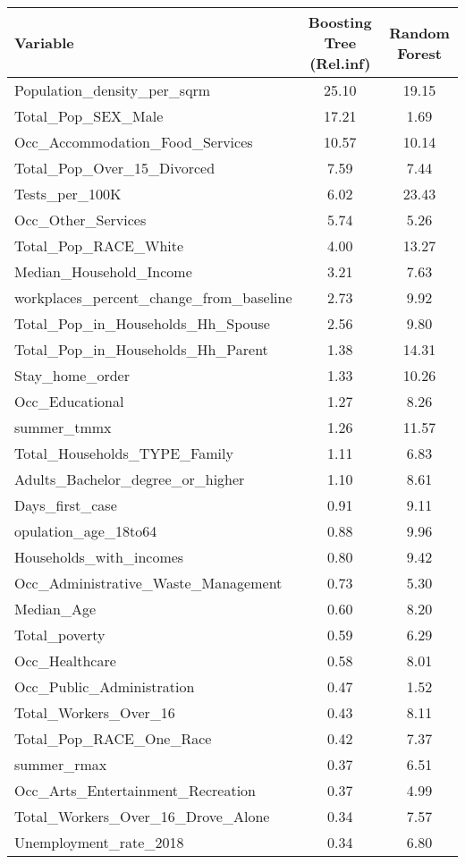 \documentclass[
]{article}
\begin{document}
\begin{table}[ht]
\centering
\begin{tabular}{lcc}
  \hline
Variable & Boosting Tree (Rel.inf) & Random Forest \\ 
  \hline
Population\_density\_per\_sqrm & 25.10 & 19.15 \\ 
Total\_Pop\_SEX\_Male & 17.21 & 1.69 \\ 
Occ\_Accommodation\_Food\_Services & 10.57 & 10.14 \\ 
Total\_Pop\_Over\_15\_Divorced & 7.59 & 7.44 \\ 
Tests\_per\_100K & 6.02 & 23.43 \\ 
Occ\_Other\_Services & 5.74 & 5.26 \\ 
Total\_Pop\_RACE\_White & 4.00 & 13.27 \\ 
Median\_Household\_Income & 3.21 & 7.63 \\ 
 workplaces\_percent\_change\_from\_baseline & 2.73 & 9.92 \\ 
 Total\_Pop\_in\_Households\_Hh_Spouse & 2.56 & 9.80  \\ 
 Total\_Pop\_in\_Households\_Hh\_Parent & 1.38 &  14.31 \\ 
  Stay\_home\_order & 1.33 & 10.26  \\ 
  Occ\_Educational & 1.27 & 8.26\\ 
  summer\_tmmx & 1.26 & 11.57 \\ 
  Total\_Households\_TYPE\_Family & 1.11 & 6.83\\ 
  Adults\_Bachelor\_degree\_or\_higher & 1.10 & 8.61\\ 
  Days\_first\_case & 0.91 & 9.11 \\ 
  opulation\_age\_18to64 & 0.88 & 9.96 \\ 
  Households\_with\_incomes & 0.80 & 9.42 \\ 
  Occ\_Administrative\_Waste\_Management & 0.73 & 5.30 \\ 
  Median\_Age & 0.60 & 8.20 \\ 
  Total\_poverty & 0.59 & 6.29 \\ 
  Occ\_Healthcare & 0.58 & 8.01 \\ 
  Occ\_Public\_Administration & 0.47 & 1.52 \\ 
  Total\_Workers\_Over\_16 & 0.43 & 8.11 \\ 
  Total\_Pop\_RACE\_One\_Race & 0.42 & 7.37 \\ 
  summer\_rmax & 0.37 & 6.51 \\ 
  Occ\_Arts\_Entertainment\_Recreation & 0.37 & 4.99 \\ 
  Total\_Workers\_Over\_16\_Drove\_Alone & 0.34 & 7.57 \\ 
  Unemployment\_rate\_2018 & 0.34 & 6.80 \\ 
   \hline
\end{tabular}
\end{table}

\newpage
\end{document}

